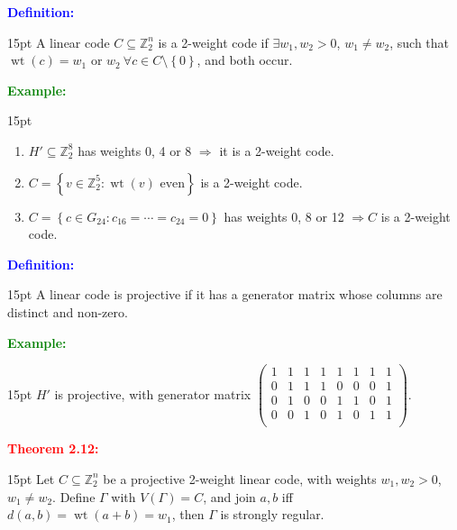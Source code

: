 \documentclass[12pt]{article}
\newcommand{\noparskip}{\vspace{-\parskip}}
\newenvironment{points}
	{\begin{enumerate}[label = (\arabic*)]}
	{\end{enumerate}}
\newenvironment{dent}
	{\begin{adjustwidth}{15pt}{}\noparskip}
	{\end{adjustwidth}}
\newenvironment{result}[1]
	{\textcolor{Red}{\textbf{#1:}}\begin{dent}}
	{\end{dent}}
\newenvironment{definition}
	{\textcolor{Blue}{\textbf{Definition:}}\begin{dent}}
	{\end{dent}}
\newenvironment{example}
	{\textcolor{Green}{\textbf{Example:}}\begin{dent}}
	{\end{dent}}
\renewcommand{\implies}{\Rightarrow}
\newcommand{\set}[1]{\left\{ #1 \right\}}
\newcommand{\Z}{\mathbb{Z}}
\newcommand{\wt}[1]{\operatorname{wt}(#1)}
\begin{document}
\begin{definition}
A linear code $C \subseteq \Z_2^n$ is a 2-weight code if $\exists w_1, w_2 > 0$, $w_1 \ne w_2$, such that $\wt{c} = w_1$ or $w_2\ \forall c \in C \setminus \set{0}$, and both occur.
\end{definition}

\begin{example}
\begin{points}
\item $H' \subseteq \Z_2^8$ has weights 0, 4 or 8 $\implies$ it is a 2-weight code.
\item $C = \set{v \in \Z_2^5: \wt{v} \text{ even}}$ is a 2-weight code.
\item $C = \set{c \in G_{24}: c_{16} = \cdots = c_{24} = 0}$ has weights 0, 8 or 12 $\implies C$ is a 2-weight code.
\end{points}
\end{example}

\begin{definition}
A linear code is projective if it has a generator matrix whose columns are distinct and non-zero.
\end{definition}

\begin{example}
$H'$ is projective, with generator matrix $\begin{pmatrix}
1 & 1 & 1 & 1 & 1 & 1 & 1 & 1 \\
0 & 1 & 1 & 1 & 0 & 0 & 0 & 1 \\
0 & 1 & 0 & 0 & 1 & 1 & 0 & 1 \\
0 & 0 & 1 & 0 & 1 & 0 & 1 & 1 \\
\end{pmatrix}$.
\end{example}

\begin{result}{Theorem 2.12}
Let $C \subseteq \Z_2^n$ be a projective 2-weight linear code, with weights $w_1, w_2 > 0$, $w_1 \ne w_2$. Define $\Gamma$ with $V(\Gamma) = C$, and join $a, b$ iff $d(a, b) = \wt{a + b} = w_1$, then $\Gamma$ is strongly regular.
\end{result}
\end{document}
